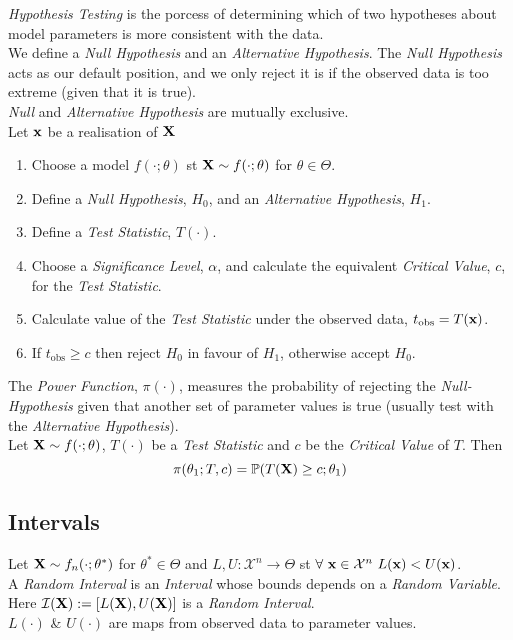 \documentclass[11pt,a4paper]{article}
\begin{document}

\textit{Hypothesis Testing} is the porcess of determining which of two hypotheses about model parameters is more consistent with the data.\\
We define a \textit{Null Hypothesis} and an \textit{Alternative Hypothesis}. The \textit{Null Hypothesis} acts as our default position, and we only reject it is if the observed data is too extreme (given that it is true).\\
\nb \textit{Null} and \textit{Alternative Hypothesis} are mutually exclusive.\\

Let $\textbf{x}$ be a realisation of $\textbf{X}$
\begin{enumerate}
	\item Choose a model $f(\cdot;\theta)$ st $\textbf{X}\sim f(\cdot;\theta)$ for $\theta\in\Theta$.
	\item Define a \textit{Null Hypothesis}, $H_0$, and an \textit{Alternative Hypothesis}, $H_1$.
	\item Define a \textit{Test Statistic}, $T(\cdot)$.
	\item Choose a \textit{Significance Level}, $\alpha$, and calculate the equivalent \textit{Critical Value}, $c$, for the \textit{Test Statistic}.
	\item Calculate value of the \textit{Test Statistic} under the observed data, $t_\text{obs}=T(\textbf{x})$.
	\item If $t_\text{obs}\geq c$ then reject $H_0$ in favour of $H_1$, otherwise accept $H_0$.
\end{enumerate}

The \textit{Power Function}, $\pi(\cdot)$, measures the probability of rejecting the \textit{Null-Hypothesis} given that another set of parameter values is true (usually test with the \textit{Alternative Hypothesis}).\\
Let $\textbf{X}\sim f(\cdot;\theta)$, $T(\cdot)$ be a \textit{Test Statistic} and $c$ be the \textit{Critical Value} of $T$. Then
$$\pi(\theta_1;T,c)=\mathbb{P}(T(\textbf{X})\geq c;\theta_1)$$

\subsection{Intervals}

Let $\textbf{X}\sim f_n(\cdot;\theta^*)$ for $\theta^*\in\Theta$ and $L,U:\mathcal{X}^n\to\Theta$ st $\forall\ \x\in\mathcal{X}^n\ L(\x)<U(\x)$.\\
A \textit{Random Interval} is an \textit{Interval} whose bounds depends on a \textit{Random Variable}.\\
Here $\mathcal{I}(\textbf{X}):=[L(\textbf{X}),U(\textbf{X})]$ is a \textit{Random Interval}.\\
\nb $L(\cdot)$ \& $U(\cdot)$ are maps from observed data to parameter values.\\
\end{document}
